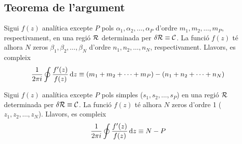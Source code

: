 \subsection{Teorema de l'argument}
\begin{thm}
    Sigui $f(z)$ analítica excepte $P$ pols $\alpha_{1}, \alpha_{2}, \dots, \alpha_{P}$ d'ordre $m_{1}, m_{2}, \dots, m_{P}$, respectivament, en una regió $\mathcal{R}$ determinada per $\delta \mathcal{R} \equiv \mathcal{C}$. La funció $f(z)$ té alhora $N$ zeros $\beta_{1}, \beta_{2}, \dots, \beta_{N}$ d'ordre $n_{1}, n_{2}, \dots, n_{N}$, respectivament. Llavors, es compleix
    \begin{align}
        \frac{1}{2\pi i} \oint \frac{f'(z)}{f(z)} \mathop{}\!\mathrm{d} z \equiv (m_{1} + m_{2} + \dots + m_{P}) - (n_{1} + n_{2} + \dots + n_{N})
    \end{align}
\end{thm}

\begin{cor}
    Sigui $f(z)$ analítica excepte $P$ pols simples ($s_{1}, s_{2}, \dots, s_{P}$) en una regió $\mathcal{R}$ determinada per $\delta \mathcal{R} \equiv \mathcal{C}$. La funció $f(z)$ té alhora $N$ zeros d'ordre 1 ($z_{1}, z_{2}, \dots, z_{N}$). Llavors, es compleix
    \begin{align}
        \frac{1}{2\pi i} \oint \frac{f'(z)}{f(z)} \mathop{}\!\mathrm{d} z \equiv N - P
    \end{align}
\end{cor}